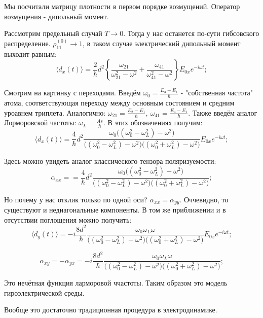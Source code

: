\documentclass[a4paper, 14pt, russian]{article}
\newcommand{\be}{\begin{equation}}
\newcommand{\ee}{\end{equation}}
\begin{document}
	Мы посчитали матрицу плотности в первом порядке возмущений. Оператор
	возмущения - дипольный момент.

	Рассмотрим предельный случай $T \rightarrow 0$. Тогда у нас останется 
	по-сути гибсовского распределение. $\rho_{11}^{(0)} \rightarrow 1$, в таком
	случае электрический дипольный момент выходит равным:
	\be
		\label{eq196}
		\langle d_{x}(t) \rangle = \frac{2}{\hbar} d^2 \left\{
			\frac{\omega_{21}}{\omega_{21}^2 - \omega^2} + 
			\frac{\omega_{41}}{\omega_{41}^2 - \omega^2}\right\}
			E_{0x} e^{-i\omega t};
	\ee


	Смотрим на картинку с переходами. Введём $\omega_0 = \frac{E_3 - E_1}{\hbar}$ - 
	"собственная частота"  атома, соответствующая переходу между основным состоянием и 
	средним уроавнем триплета. Аналогично: $\omega_{21} = \frac{E_2 - E_1}{\hbar},~
	\omega_{41} = \frac{E_4 - E_1}{\hbar}$. Также введём аналог Лорморовской частоты:
	$\omega_L = \frac{As}{\hbar}$. В этих обозначениях получим:
	\be
		\label{eq197}
		\langle d_{x}(t) \rangle = \frac{4}{\hbar} d^2 
			\frac{\omega_0 \big((\omega_0^2 - \omega_L^2) - \omega^2\big)}
			{\big((\omega_0^2 - \omega_L^2) - \omega^2\big)
			\big((\omega_0^2 + \omega_L^2) - \omega^2\big)} E_{0x} e^{-i\omega t};
	\ee

	Здесь можно увидеть аналог классического тензора поляризуемости:
	\be
		\label{eq198}
		\alpha_{xx} = = \frac{4}{\hbar} d^2 
			\frac{\omega_0 \big((\omega_0^2 - \omega_L^2) - \omega^2\big)}
			{\big((\omega_0^2 - \omega_L^2) - \omega^2\big)
			\big((\omega_0^2 + \omega_L^2) - \omega^2\big)};
	\ee

	Но почему у нас отклик только по одной оси? $\alpha_{xx} = \alpha_{yy}$.
	Оччевидно, то существуют и недиагональные компоненты. В том же приближении
	и в отсутствии поглощения можно получить:
	\be
		\label{eq199}
		\langle d_{y}(t) \rangle = - i \frac{8d^2}{\hbar} 
			\frac{\omega_0 \omega_L \omega}
			{\big((\omega_0^2 - \omega_L^2) - \omega^2\big)
			\big((\omega_0^2 + \omega_L^2) - \omega^2\big)} E_{0x} e^{-i\omega t};
	\ee

	\be
		\label{eq200}
		\alpha_{xy} = - \alpha_{yx} = - i \frac{8d^2}{\hbar} 
			\frac{\omega_0 \omega_L \omega}
			{\big((\omega_0^2 - \omega_L^2) - \omega^2\big)
			\big((\omega_0^2 + \omega_L^2) - \omega^2\big)};
	\ee

	Это нечётная функция ларморовой ччастоты. Таким образом 
	это модель гироэлектрической среды.

	Вообще это достаточно традиционная процедура в электродинамике. 
\end{document}
